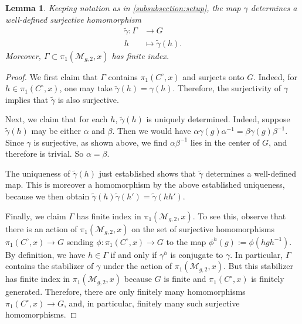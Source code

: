 \documentclass[12 pt]{amsart}
\theoremstyle{plain}
\newtheorem{lemma}[subsubsection]{Lemma}
\theoremstyle{definition}
\theoremstyle{remark}
\numberwithin{equation}{section}
\begin{document}
\begin{lemma}
	\label{lemma:center-free-group}
	Keeping notation as in \autoref{subsubsection:setup},
	the map $\gamma$ determines a well-defined surjective homomorphism 
	\begin{align*}
		\widetilde{\gamma}: \Gamma  & \rightarrow G\\
		h & \mapsto \widetilde{\gamma}(h).
	\end{align*}
	Moreover, $\Gamma \subset\pi_1(\mathscr{M}_{g,2},x)$ has finite index.
\end{lemma}
\begin{proof}
	We first claim that $\Gamma$ contains $\pi_1(C^\circ, x)$ and surjects
	onto $G$. Indeed, for $h\in
\pi_1(C^\circ, x)$, one may take $\widetilde{\gamma}(h)=\gamma(h)$.
Therefore, the surjectivity of $\gamma$ implies that $\widetilde{\gamma}$ is
also surjective.

	Next, we claim that for each $h$, $\widetilde{\gamma}(h)$ is uniquely determined. 
	Indeed, suppose $\widetilde{\gamma}(h)$ may be either
	$\alpha$ and $\beta$. Then we would have $\alpha \gamma(g) \alpha^{-1} =
	\beta \gamma(g) \beta^{-1}$.
	Since $\gamma$ is surjective, as shown above, we find $\alpha
	\beta^{-1}$ lies in the center of $G$, and therefore is trivial. So
	$\alpha = \beta$.	

	The uniqueness of $\widetilde{\gamma}(h)$ just established shows that $\widetilde{\gamma}$ determines a well-defined map.
This is moreover a homomorphism by the above established uniqueness, because we
then obtain $\widetilde{\gamma}(h) \widetilde{\gamma}(h') =
\widetilde{\gamma}(hh')$.   

Finally, we claim $\Gamma$ has finite index in $\pi_1(\mathscr{M}_{g,2}, x)$.
To see this, observe that there is an action of $\pi_1(\mathscr{M}_{g,2}, x)$
on the set of surjective homomorphisms $\pi_1(C^{\circ},x) \to G$ sending $\phi:
\pi_1(C^{\circ},x) \to G$ to the map $\phi^h(g) := \phi(hgh^{-1})$.
By definition, we have $h \in \Gamma$ if and only if $\gamma^h$ is conjugate to $\gamma$.
In particular, $\Gamma$ contains the stabilizer of $\gamma$ under the action of 
$\pi_1(\mathscr{M}_{g,2}, x)$.
But this stabilizer has finite index in 
$\pi_1(\mathscr{M}_{g,2}, x)$ because 
$G$ is finite and $\pi_1(C^\circ, x)$ is finitely generated. 
Therefore,
there are only
finitely many 
homomorphisms $\pi_1(C^\circ, x) \to G$,
and, in particular, finitely many such surjective homomorphisms.

\end{proof}
\end{document}
